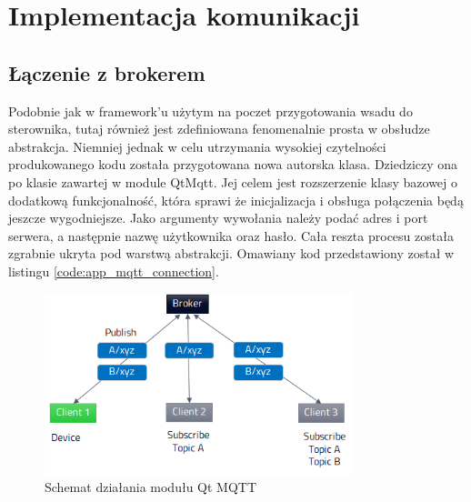  \section{Implementacja komunikacji}
      \subsection{Łączenie z brokerem}
        Podobnie jak w framework'u użytym na poczet przygotowania wsadu do sterownika, tutaj również jest zdefiniowana fenomenalnie prosta w obsłudze abstrakcja. Niemniej jednak w celu utrzymania wysokiej czytelności produkowanego kodu została przygotowana nowa autorska klasa. Dziedziczy ona po klasie zawartej w module QtMqtt. Jej celem jest rozszerzenie klasy bazowej o dodatkową funkcjonalność, która sprawi że inicjalizacja i obsługa połączenia będą jeszcze wygodniejsze. Jako argumenty wywołania należy podać adres i port serwera, a następnie nazwę użytkownika oraz hasło. Cała reszta procesu została zgrabnie ukryta pod warstwą abstrakcji. Omawiany kod przedstawiony został w listingu \ref{code:app_mqtt_connection}.
        
                
       \begin{figure}[ht]
          \centering
          \includegraphics[width=0.8\textwidth]{img/qt_mqtt.png}
          \caption{Schemat działania modułu Qt MQTT \cite{qt_mqtt_fig}}
          \label{fig:qt_mqtt}
        \end{figure}   
        
        \begin{kod}
          \inputminted[firstline=21, lastline=34]{cpp}{app/listings/mqtt.cpp}
          \caption{Nawiązanie połączenia z brokerem}
          \label{code:app_mqtt_connection}
        \end{kod}
        
